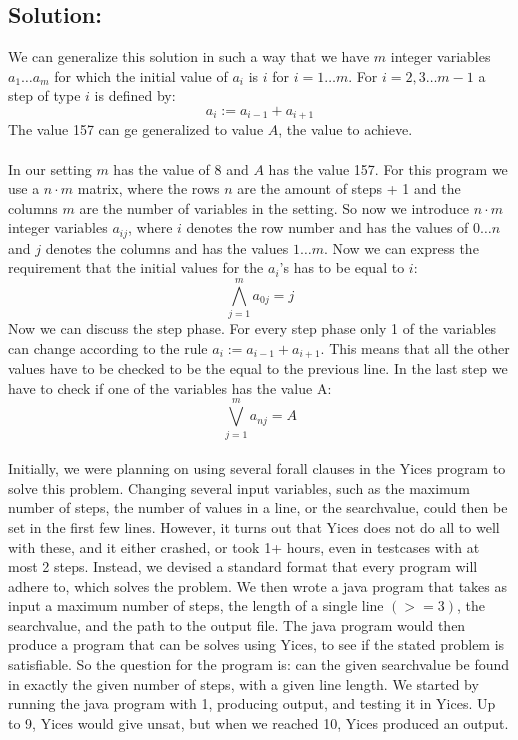 \documentclass[12pt]{article}
\begin{document}
\subsection*{Solution:}
We can generalize this solution in such a way that we have $m$ integer variables $a_1 \ldots a_m$ for which the initial value of $a_i$ is $i$ for $i = 1 \ldots m$. For $i = 2,3 \ldots m-1$ a step of type $i$ is defined by:
\[a_i := a_{i-1} + a_{i+1} \]
The value 157 can ge generalized to value $A$, the value to achieve. \\
\\
\indent In our setting $m$ has the value of 8 and $A$ has the value 157. For this program we use a $n \cdot m$ matrix, where the rows $n$ are the amount of steps + 1 and the columns $m$ are the number of variables in the setting. So now we introduce $n \cdot m$ integer variables $a_{ij}$, where $i$ denotes the row number and has the values of $0\ldots n$ and $j$ denotes the columns and has the values $1\ldots m$.  Now we can express the requirement that the initial values for the $a_i$'s has to be equal to $i$:
\[\bigwedge_{j=1}^{m} a_{0j} = j \]
Now we can discuss the step phase. For every step phase only 1 of the variables can change according to the rule $a_i := a_{i-1} + a_{i+1}$. This means that all the other values have to be checked to be the equal to the previous line.
In the last step we have to check if one of the variables has the value A:
\[\bigvee_{j=1}^{m} a_{nj} = A \] \\

Initially, we were planning on using several forall clauses in the Yices program to solve this problem.
Changing several input variables, such as the maximum number of steps, the number of values in a line, or the searchvalue, could then be set in the first few lines.
However, it turns out that Yices does not do all to well with these, and it either crashed, or took 1+ hours, even in testcases with at most 2 steps.
Instead, we devised a standard format that every program will adhere to, which solves the problem.
We then wrote a java program that takes as input a maximum number of steps, the length of a single line $(>=3)$, the searchvalue, and the path to the output file.
The java program would then produce a program that can be solves using Yices, to see if the stated problem is satisfiable.
So the question for the program is: can the given searchvalue be found in exactly the given number of steps, with a given line length.
We started by running the java program with 1, producing output, and testing it in Yices.
Up to 9, Yices would give unsat, but when we reached 10, Yices produced an output. \\
\end{document}
